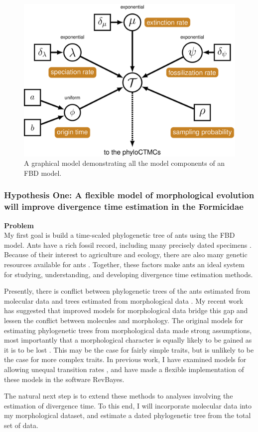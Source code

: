 \documentclass[12pt]{article}
\begin{document}
\begin{figure}
  \caption{A graphical model demonstrating all the model components of an FBD model.}
  \centering
    \includegraphics[width=1\textwidth]{Fig2}
\end{figure} 

\subsubsection*{Hypothesis One: A flexible model of morphological evolution will improve divergence time estimation in the Formicidae} 
\textbf{Problem} \\
My first goal is build a time-scaled phylogenetic tree of ants using the FBD model. 
Ants have a rich fossil record, including many precisely dated specimens \cite{barden2017}.
Because of their interest to agriculture and ecology, there are also many genetic resources available for ants \cite{blanchard2017}.
Together, these factors make ants an ideal system for studying, understanding, and developing divergence time estimation methods. \par
Presently, there is conflict between  phylogenetic trees of the ants estimated from molecular data and trees estimated from morphological data \cite{barden2017}.
My recent work \cite{Wright2017} has suggested that improved models for morphological data bridge this gap and lessen the conflict between molecules and morphology.
The original models for estimating phylogenetic trees from morphological data made strong assumptions, most importantly that a morphological character is equally likely to be gained as it is to be lost \cite{lewis2001}.
This may be the case for fairly simple traits, but is unlikely to be the case for more complex traits.
In previous work, I have examined models for allowing unequal transition rates \cite{Wright2016, Ronquist2003}, and have made a flexible implementation of these models in the software RevBayes.\par
The natural next step is to extend these methods to analyses involving the estimation of divergence time. 
To this end, I will incorporate molecular data into my morphological dataset, and estimate a dated phylogenetic tree from the total set of data. \par
\end{document}
